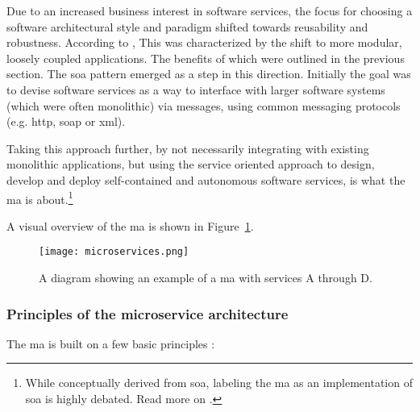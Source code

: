 Due to an increased business interest in software services, the focus for
choosing a software architectural style and paradigm shifted towards reusability
and robustness. According to \textcite{Dragoni_etal_2018}, This was
characterized by the shift to more modular, loosely coupled applications. The
benefits of which were outlined in the previous section. The \gls{soa} pattern
emerged as a step in this direction. Initially the goal was to devise software
services as a way to interface with larger software systems (which were often
monolithic) via messages, using common messaging protocols (e.g. \gls{http},
\gls{soap} or \gls{xml}).

Taking this approach further, by not necessarily integrating with existing
monolithic applications, but using the service oriented approach to design,
develop and deploy self-contained and autonomous software services, is what the
\gls{ma} is about.\footnote{While conceptually derived from \gls{soa}, labeling
the \gls{ma} as an implementation of \gls{soa} is highly debated. Read more on
.}


A visual overview of the \gls{ma} is shown in Figure~\ref{fig:microservices}.


\begin{figure} %
    \centering
    \texttt{[image: microservices.png]}
    \caption[Microservices]{A diagram showing an example of a \gls{ma} with
    services A through D.}
    \label{fig:microservices}
\end{figure}


\subsubsection{Principles of the microservice architecture}
\label{principles-of-the-mfa}

The \gls{ma} is built on a few basic principles \autocite{Dragoni_etal_2018}
\autocite{Dragoni_etal_2017} \autocite{Fowler_Microservices_2014}
\autocite{Gysels_2020} \autocite{Newman_2015}:


